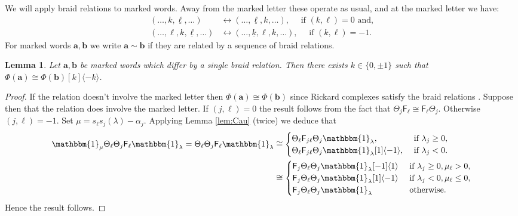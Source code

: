 \documentclass[11pt,reqno]{amsart}
\numberwithin{equation}{section}
\newtheorem{Lemma}[equation]{Lemma}
\theoremstyle{definition}
\theoremstyle{named}
\newcommand{\sF}{\mathsf{F}}
\newcommand{\ba}{\mathbf{a}}
\newcommand{\bb}{\mathbf{b}}
\newcommand{\ul}[1]{\underline{#1}}
\newcommand{\bone}{\mathbbm{1}}
\begin{document}
We will apply braid relations to marked words.  Away from the marked letter these operate as usual, and at the marked letter we have:
\begin{align}
\label{rel1}(\hdots,k,\ul{\ell},\hdots) &\leftrightarrow (\hdots,\ul{\ell},k,\hdots),\quad \text{ if } (k,\ell)=0 \text{ and,}\\
\label{rel2}(\hdots,\ell,k,\ul{\ell},\hdots) &\leftrightarrow (\hdots,\ul{k},\ell,k,\hdots),\quad \text{ if } (k,\ell)=-1.
\end{align}
For marked words $\ba,\bb$ we write $\ba \sim \bb$ if they are related by a sequence of braid relations.  
\begin{Lemma}
Let $\ba,\bb$ be marked words which differ by a single braid relation.  Then  there exists $k\in \{0,\pm 1\}$ such that $\Phi(\ba) \cong \Phi(\bb)[k]\langle -k \rangle$.
\end{Lemma}
\begin{proof}
If the relation doesn't involve the marked letter then $\Phi(\ba)\cong \Phi(\bb)$ since Rickard complexes satisfy the braid relations \cite[Theorem 2.10]{CK3}.  Suppose then that the relation does involve the marked letter.
If $(j,\ell)=0$ the result follows from the fact that $\Theta_j\sF_\ell \cong \sF_\ell \Theta_j$.  Otherwise $(j,\ell)=-1$.  Set $\mu=s_\ell s_j(\lambda)-\alpha_j$.  Applying Lemma \ref{lem:Cau} (twice) we deduce that
\begin{align*}
\bone_\mu\Theta_\ell\Theta_j \sF_\ell \bone_\lambda = \Theta_\ell\Theta_j \sF_\ell \bone_\lambda &\cong
\begin{cases}
\Theta_\ell \sF_{j\ell}\Theta_j\bone_\lambda, &\text{ if } \lambda_j\geq 0,\\
\Theta_\ell \sF_{j\ell}\Theta_j\bone_\lambda[1]\langle -1 \rangle, &\text{ if } \lambda_j< 0.
\end{cases}\\
&\cong
\begin{cases}
\sF_j\Theta_\ell\Theta_j\bone_\lambda[-1]\langle 1 \rangle &\text{ if } \lambda_j \geq0, \mu_\ell > 0,\\
\sF_j\Theta_\ell\Theta_j\bone_\lambda[1]\langle -1 \rangle &\text{ if } \lambda_j <0, \mu_\ell \leq 0,\\
\sF_j\Theta_\ell\Theta_j\bone_\lambda &\text{ otherwise.}
\end{cases}
\end{align*}
Hence the result follows.
\end{proof}
\end{document}
